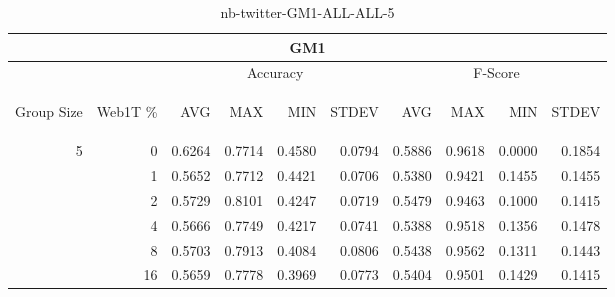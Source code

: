 \begin{center}
\begin{table}[htbp]
\begin{center}
\begin{tabular}{ | r | r | r | r | r | r | r | r | r | r |}
\hline
\multicolumn{10}{|c|}{GM1}\\
\hline
 & & \multicolumn{4}{|c|}{Accuracy} & \multicolumn{4}{|c|}{F-Score}\\ \cline{3-10}
\begin{sideways}Group Size\end{sideways} & \begin{sideways}Web1T \%\end{sideways} & \begin{sideways}AVG\end{sideways} & \begin{sideways}MAX\end{sideways} & \begin{sideways}MIN\end{sideways} & \begin{sideways}STDEV\end{sideways} & \begin{sideways}AVG\end{sideways} & \begin{sideways}MAX\end{sideways} & \begin{sideways}MIN\end{sideways} & \begin{sideways}STDEV\end{sideways}\\
\hline
\multirow{5}{*}{5}
 & 0 & 0.6264 & 0.7714 & 0.4580 & 0.0794 & 0.5886 & 0.9618 & 0.0000 & 0.1854\\ \cline{2-10}
 & 1 & 0.5652 & 0.7712 & 0.4421 & 0.0706 & 0.5380 & 0.9421 & 0.1455 & 0.1455\\ \cline{2-10}
 & 2 & 0.5729 & 0.8101 & 0.4247 & 0.0719 & 0.5479 & 0.9463 & 0.1000 & 0.1415\\ \cline{2-10}
 & 4 & 0.5666 & 0.7749 & 0.4217 & 0.0741 & 0.5388 & 0.9518 & 0.1356 & 0.1478\\ \cline{2-10}
 & 8 & 0.5703 & 0.7913 & 0.4084 & 0.0806 & 0.5438 & 0.9562 & 0.1311 & 0.1443\\ \cline{2-10}
 & 16 & 0.5659 & 0.7778 & 0.3969 & 0.0773 & 0.5404 & 0.9501 & 0.1429 & 0.1415\\ \cline{2-10}
\hline
\end{tabular}
\caption{nb-twitter-GM1-ALL-ALL-5}
\label{table:nb-twitter-GM1-ALL-ALL-5}
\end{center}
\end{table}
\end{center}

